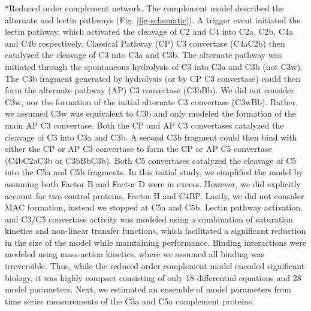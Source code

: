 \documentclass[12pt]{article}
\makeatletter
\renewcommand\subsection{\@startsection
	{subsection}{2}{0mm}
	{-0.05in}
	{-0.5\baselineskip}
	{\normalfont\normalsize\bfseries}}
\makeatother
\begin{document}
\subsection*{Reduced order complement network.}
The complement model described the alternate and lectin pathways (Fig. \ref{fig-schematic}).
A trigger event initiated the lectin pathway, which activated the cleavage of C2 and C4 into C2a, C2b, C4a and C4b respectively.
Classical Pathway (CP) C3 convertase (C4aC2b) then catalyzed the cleavage of C3 into C3a and C3b.
The alternate pathway was initiated through the spontaneous hydrolysis of C3 into C3a and C3b (not C3w).
The C3b fragment generated by hydrolysis (or by CP C3 convertase) could then form the alternate pathway (AP) C3 convertase (C3bBb).
We did not consider C3w, nor the formation of the initial alternate C3 convertase (C3wBb).
Rather, we assumed C3w was equivalent to C3b and only modeled the formation of the main AP C3 convertase.
Both the CP and AP C3 convertases catalyzed the cleavage of C3 into C3a and C3b.
A second C3b fragment could then bind with either the CP or AP C3 convertase to form the CP or AP C5 convertase (C4bC2aC3b or C3bBbC3b).
Both C5 convertases catalyzed the cleavage of C5 into the C5a and C5b fragments.
In this initial study, we simplified the model by assuming both Factor B and Factor D were in excess.
However, we did explicitly account for two control proteins, Factor H and C4BP.
Lastly, we did not consider MAC formation, instead we stopped at C5a and C5b.
Lectin pathway activation, and C3/C5 convertase activity was modeled using a combination of saturation kinetics and non-linear transfer functions, which facilitated a significant reduction in the size of the model while maintaining performance.
Binding interactions were modeled using mass-action kinetics, where we assumed all binding was irreversible.
Thus, while the reduced order complement model encoded significant biology, it was highly compact consisting of only 18 differential equations and 28 model parameters.
Next, we estimated an ensemble of model parameters from time series measurements of the C3a and C5a complement proteins.
\end{document}
